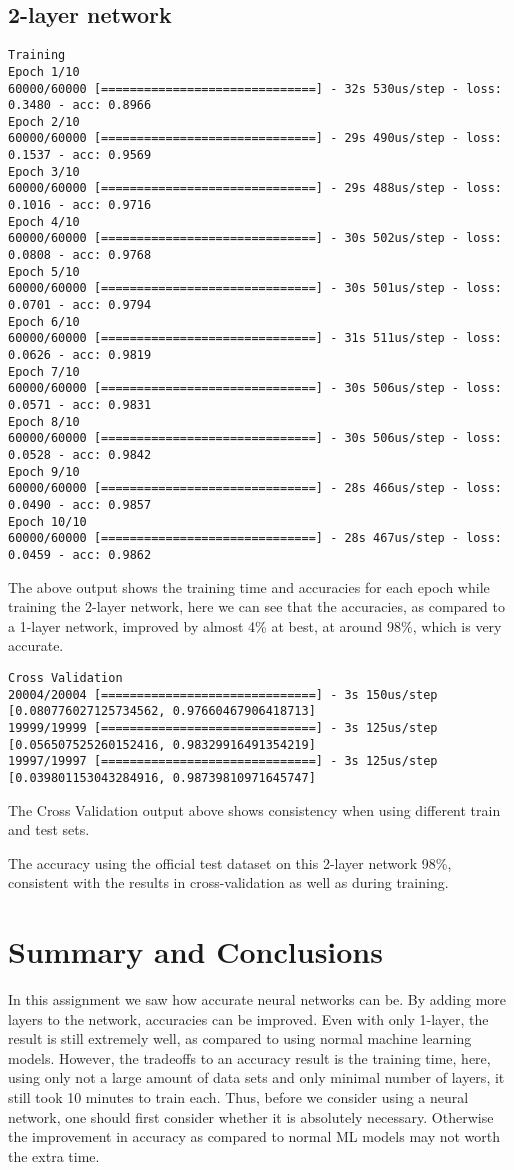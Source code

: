 \documentclass[12pt, a4paper]{article}
\begin{document}
\subsection{2-layer network}
\begin{verbatim}
Training
Epoch 1/10
60000/60000 [==============================] - 32s 530us/step - loss: 0.3480 - acc: 0.8966
Epoch 2/10
60000/60000 [==============================] - 29s 490us/step - loss: 0.1537 - acc: 0.9569
Epoch 3/10
60000/60000 [==============================] - 29s 488us/step - loss: 0.1016 - acc: 0.9716
Epoch 4/10
60000/60000 [==============================] - 30s 502us/step - loss: 0.0808 - acc: 0.9768
Epoch 5/10
60000/60000 [==============================] - 30s 501us/step - loss: 0.0701 - acc: 0.9794
Epoch 6/10
60000/60000 [==============================] - 31s 511us/step - loss: 0.0626 - acc: 0.9819
Epoch 7/10
60000/60000 [==============================] - 30s 506us/step - loss: 0.0571 - acc: 0.9831
Epoch 8/10
60000/60000 [==============================] - 30s 506us/step - loss: 0.0528 - acc: 0.9842
Epoch 9/10
60000/60000 [==============================] - 28s 466us/step - loss: 0.0490 - acc: 0.9857
Epoch 10/10
60000/60000 [==============================] - 28s 467us/step - loss: 0.0459 - acc: 0.9862
\end{verbatim}
The above output shows the training time and accuracies for each epoch while training the 2-layer network, here we can see that the accuracies, as compared to a 1-layer network, improved by almost 4\% at best, at around 98\%, which is very accurate.

\begin{verbatim}
Cross Validation
20004/20004 [==============================] - 3s 150us/step
[0.080776027125734562, 0.97660467906418713]
19999/19999 [==============================] - 3s 125us/step
[0.056507525260152416, 0.98329916491354219]
19997/19997 [==============================] - 3s 125us/step
[0.039801153043284916, 0.98739810971645747]
\end{verbatim}

The Cross Validation output above shows consistency when using different train and test sets.

The accuracy using the official test dataset on this 2-layer network 98\%, consistent with the results in cross-validation as well as during training.

\section{Summary and Conclusions}
In this assignment we saw how accurate neural networks can be. By adding more layers to the network, accuracies can be improved. Even with only 1-layer, the result is still extremely well, as compared to using normal machine learning models. However, the tradeoffs to an accuracy result is the training time, here, using only not a large amount of data sets and only minimal number of layers, it still took 10 minutes to train each. Thus, before we consider using a neural network, one should first consider whether it is absolutely necessary. Otherwise the improvement in accuracy as compared to normal ML models may not worth the extra time.
\end{document}
